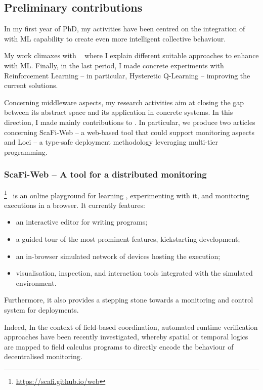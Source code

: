 \documentclass[11pt]{article}
\begin{document}
\subsection{Preliminary contributions}
In my first year of PhD, my activities have been centred on
the integration of \ac{} with ML capability to create even more
intelligent collective behaviour. 

My work climaxes with ~\cite{research} where I explain different suitable approaches to
enhance \ac{} with ML. Finally, in the last period, I made concrete
experiments with Reinforcement Learning -- in particular, Hysteretic Q-Learning \cite{hysteretic-q} -- improving the current \ac{} solutions.

Concerning middleware aspects, my research activities aim at closing the gap between
its abstract space and its application in concrete systems. In this direction, I made mainly contributions to \scafi. In particular, we produce two articles concerning ScaFi-Web -- a web-based tool that could support monitoring aspects and \scafi Loci -- a type-safe deployment methodology leveraging multi-tier programming.
\subsubsection{ScaFi-Web -- A tool for a distributed monitoring}
\scafiweb{}\footnote{\url{https://scafi.github.io/web}}~\cite{DBLP:conf/coordination/AguzziCMPV21}
 is an online playground for learning \ac{}, experimenting with it, and monitoring executions in a browser.
It currently features:
\begin{itemize}
 \item an interactive editor for writing \scafi{} programs;
 \item a guided tour of the most prominent features, kickstarting development;
 \item an in-browser simulated network of devices hosting the execution;
 \item visualisation, inspection, and interaction tools integrated with the simulated environment.
\end{itemize}

Furthermore, it also provides a stepping stone towards a monitoring and control system for \ac{} deployments.

Indeed, In the context of field-based coordination, automated runtime verification approaches have been recently investigated, whereby spatial or temporal logics are mapped to field calculus programs to directly encode the behaviour of decentralised monitoring.
\end{document}

